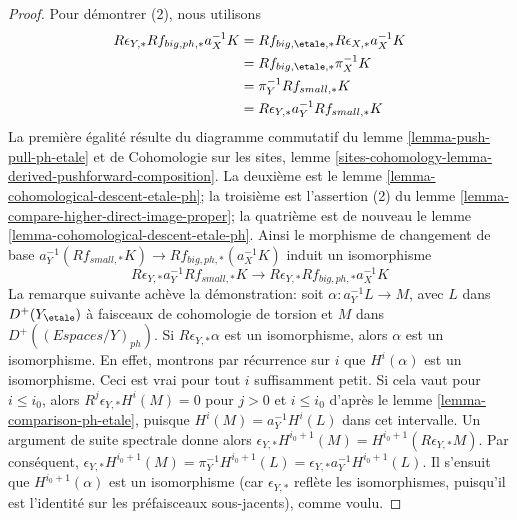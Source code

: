 \begin{proof}
\medskip\noindent
Pour démontrer (2), nous utilisons
\begin{align*}
R\epsilon_{Y, *}Rf_{big, ph, *}a_X^{-1}K
& =
Rf_{big, \etale, *}R\epsilon_{X, *}a_X^{-1}K \\
& =
Rf_{big, \etale, *}\pi_X^{-1}K \\
& =
\pi_Y^{-1}Rf_{small, *}K \\
& =
R\epsilon_{Y, *} a_Y^{-1}Rf_{small, *}K
\end{align*}
La première égalité résulte du diagramme commutatif du lemme
\ref{lemma-push-pull-ph-etale} et de Cohomologie sur les sites, lemme
\ref{sites-cohomology-lemma-derived-pushforward-composition}.
La deuxième est le lemme \ref{lemma-cohomological-descent-etale-ph}; la
troisième est l'assertion (2) du lemme
\ref{lemma-compare-higher-direct-image-proper}; la quatrième est de nouveau
le lemme \ref{lemma-cohomological-descent-etale-ph}.
Ainsi le morphisme de changement de base
$a_Y^{-1}(Rf_{small, *}K) \to Rf_{big, ph, *}(a_X^{-1}K)$
induit un isomorphisme
$$
R\epsilon_{Y, *}a_Y^{-1}Rf_{small, *}K \to
R\epsilon_{Y, *}Rf_{big, ph, *}a_X^{-1}K
$$
La remarque suivante achève la démonstration: soit
$\alpha : a_Y^{-1}L \to M$, avec $L$ dans $D^+(Y_\etale)$ à faisceaux de
cohomologie de torsion et $M$ dans $D^+((\textit{Espaces}/Y)_{ph})$.
Si $R\epsilon_{Y, *}\alpha$ est un isomorphisme, alors $\alpha$ est un
isomorphisme. En effet, montrons par récurrence sur $i$ que $H^i(\alpha)$ est un
isomorphisme. Ceci est vrai pour tout $i$ suffisamment petit. Si cela vaut pour
$i \leq i_0$, alors $R^j\epsilon_{Y, *}H^i(M) = 0$ pour $j > 0$ et
$i \leq i_0$ d'après le lemme \ref{lemma-comparison-ph-etale}, puisque
$H^i(M) = a_Y^{-1}H^i(L)$ dans cet intervalle. Un argument de suite spectrale
donne alors
$\epsilon_{Y, *}H^{i_0 + 1}(M) = H^{i_0 + 1}(R\epsilon_{Y, *}M)$.
Par conséquent, $\epsilon_{Y, *}H^{i_0 + 1}(M) =
\pi_Y^{-1}H^{i_0 + 1}(L) =
\epsilon_{Y, *}a_Y^{-1}H^{i_0 + 1}(L)$. Il s'ensuit que
$H^{i_0 + 1}(\alpha)$ est un isomorphisme (car $\epsilon_{Y, *}$ reflète les
isomorphismes, puisqu'il est l'identité sur les préfaisceaux sous-jacents),
comme voulu.
\end{proof}



















